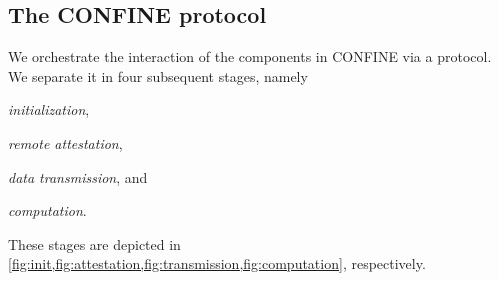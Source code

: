 \subsection{The CONFINE protocol}
\label{sec:deployment:protocol}
We orchestrate the interaction of the components in CONFINE via a protocol. We separate it in four subsequent stages, namely
\begin{inparaenum}
	\item \textit{initialization}, \item \textit{remote attestation}, \item \textit{data transmission}, and \item \textit{computation}.
\end{inparaenum}
These stages are depicted in \cref{fig:init,fig:attestation,fig:transmission,fig:computation}, respectively.

